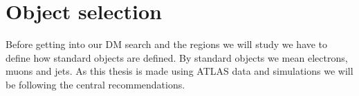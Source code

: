 \documentclass[12pt, a4paper]{book}
\begin{document}
\section{Object selection}\label{sec:obj_sel}
Before getting into our DM search and the regions we will study we have to define how standard objects are defined. By standard objects we mean electrons, muons and jets. As this thesis is made using ATLAS data and simulations we will be following the central recommendations.%
\end{document}
